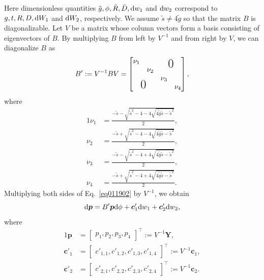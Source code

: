 \documentclass[aps,pra,superscriptaddress,twocolumn
]{revtex4-2}
\renewcommand{\d}{{\rm d}}
\begin{document}
 Here dimensionless quantities $\tilde g,\phi, \tilde R, \tilde D, \d w_1$ and $\d w_2$ 
 correspond to $g, t, R, D, \d W_1$ and $\d W_2$, respectively. 
 We assume $\tilde s \neq 4 \tilde g$
 so that the matrix $B$ is diagonalizable.
 Let $V$ be a matrix whose column vectors form a basis consisting of eigenvectors of $B$.
 By multiplying $B$ from left by $V^{-1}$ and from right by $V$, 
 we can diagonalize $B$ as 
 \begin{alignat}{1}
  B'&:= V^{-1} B V =
   \begin{bmatrix}
       \begin{matrix}
         \nu_1 & \\ & \nu_2
       \end{matrix} & \mbox{\LARGE 0} \\
  \raisebox{-1.2ex}{\mbox{\LARGE 0}} & 
       \begin{matrix}
         \nu_3 & \\ & \nu_4
       \end{matrix}
   \end{bmatrix}, \\
\end{alignat}
where
\begin{alignat}{1}
   \nu_1 &= \frac{- \tilde s - \sqrt{\tilde s^2 -4- 4\sqrt{4\tilde g \tilde s - \tilde s^2}}}{2} , \label{nu1} \\
   \nu_2 &= \frac{- \tilde s + \sqrt{\tilde s^2 -4- 4\sqrt{4\tilde g \tilde s - \tilde s^2}}}{2} , \label{nu2} \\
   \nu_3 &= \frac{- \tilde s - \sqrt{\tilde s^2 -4 + 4\sqrt{4\tilde g \tilde s - \tilde s^2}}}{2} , \label{nu3} \\
   \nu_4 &= \frac{- \tilde s + \sqrt{\tilde s^2 -4 + 4\sqrt{4\tilde g \tilde s - \tilde s^2}}}{2}. \label{nu4}
 \end{alignat}
 Multiplying both sides of Eq.~\eqref{eq011902} by $V^{-1}$, 
 we obtain 
 \begin{equation}
  \d \bm p
  = B' \bm p \d \phi + \bm c'_1 \d w_1 + \bm c'_2 \d w_2, \label{eq011903}
 \end{equation}
 where 
 \begin{alignat}{1}
  \bm p &=\begin{bmatrix}
  p_1 , p_2 , p_3 , p_4
   \end{bmatrix}^\top := V^{-1} \bm Y, \label{eq011904}
  \\
  \bm c'_1 &=
     \begin{bmatrix}
  c'_{1,1} , c'_{1,2} , c'_{1,3} , c'_{1,4}
     \end{bmatrix}^\top
  :=
  V^{-1} \bm c_1, \\
  \bm c'_2 &=
     \begin{bmatrix}
  c'_{2,1} , c'_{2,2} , c'_{2,3} , c'_{2,4}
     \end{bmatrix}^\top
  := V^{-1} \bm c_2.
 \end{alignat}
\end{document}
